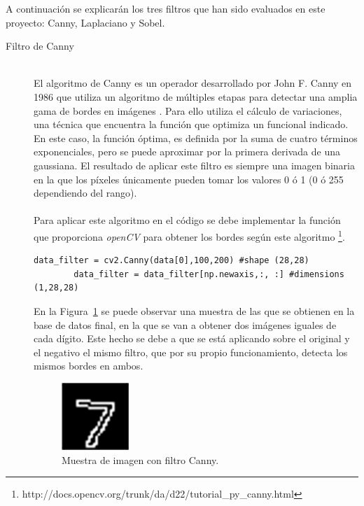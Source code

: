 A continuación se explicarán los tres filtros que han sido evaluados en este proyecto: Canny, Laplaciano y Sobel.\\

\begin{description}
	\item[Filtro de Canny] \hfill 
	\vspace{10pt}
	\\
	El algoritmo de Canny es un operador desarrollado por John F. Canny en 1986 que utiliza un algoritmo de múltiples etapas para detectar una amplia gama de bordes en imágenes \cite{4767851}. Para ello utiliza el cálculo de variaciones, una técnica que encuentra la función que optimiza un funcional indicado. En este caso, la función óptima, es definida por la suma de cuatro términos exponenciales, pero se puede aproximar por la primera derivada de una gaussiana. El resultado de aplicar este filtro es siempre una imagen binaria en la que los píxeles únicamente pueden tomar los valores 0 ó 1 (0 ó 255 dependiendo del rango).\\
	\vspace{-10pt}
	\\
	Para aplicar este algoritmo en el código se debe implementar la función que proporciona \textit{openCV} para obtener los bordes según este algoritmo \footnote{http://docs.opencv.org/trunk/da/d22/tutorial\_py\_canny.html}.
	\vspace{10pt}
	\begin{lstlisting}[frame=single]
		data_filter = cv2.Canny(data[0],100,200) #shape (28,28)
		data_filter = data_filter[np.newaxis,:, :] #dimensions (1,28,28)
	\end{lstlisting}
	En la Figura~\ref{fig.canny} se puede observar una muestra de las que se obtienen en la base de datos final, en la que se van a obtener dos imágenes iguales de cada dígito. Este hecho se debe a que se está aplicando sobre el original y el negativo el mismo filtro, que por su propio funcionamiento, detecta los mismos bordes en ambos.\\
	
	\begin{figure}[H]
		\begin{center}
			\includegraphics[width=0.25\textwidth]{figures/canny}
			\caption{Muestra de imagen con filtro Canny.}
			\label{fig.canny}
		\end{center}
	\end{figure}
	

\end{description}
